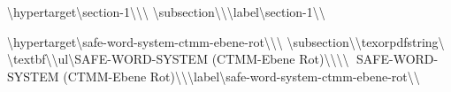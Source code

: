 \textbackslash{}hypertarget\textbackslash{}{section-1\textbackslash{}}\textbackslash{}{\textbackslash{}%
\textbackslash{}subsection\textbackslash{}{\textbackslash{}}\textbackslash{}label\textbackslash{}{section-1\textbackslash{}}\textbackslash{}}

\textbackslash{}hypertarget\textbackslash{}{safe-word-system-ctmm-ebene-rot\textbackslash{}}\textbackslash{}{\textbackslash{}%
\textbackslash{}subsection\textbackslash{}{\textbackslash{}texorpdfstring\textbackslash{}{🔑 \textbackslash{}textbf\textbackslash{}{\textbackslash{}ul\textbackslash{}{SAFE-WORD-SYSTEM (CTMM-Ebene Rot)\textbackslash{}}\textbackslash{}}\textbackslash{}}\textbackslash{}{🔑 SAFE-WORD-SYSTEM (CTMM-Ebene Rot)\textbackslash{}}\textbackslash{}}\textbackslash{}label\textbackslash{}{safe-word-system-ctmm-ebene-rot\textbackslash{}}\textbackslash{}}

